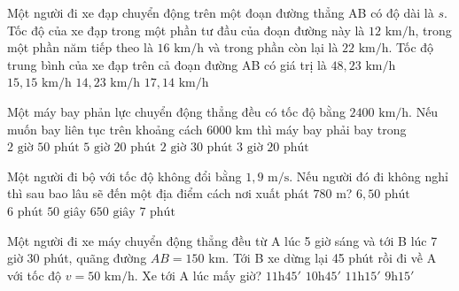 \begin{vd} Một người đi xe đạp chuyển động trên một đoạn đường thẳng AB có độ dài là $s$. Tốc độ của xe đạp trong một phần tư đầu của đoạn đường này là $12\text{ km/h}$, trong một phần năm tiếp theo là $16\text{ km/h}$ và trong phần còn lại là $22\text{ km/h}$. Tốc độ trung bình của xe đạp trên cả đoạn đường AB có giá trị là
\choice
{$48{,}23\text{ km/h}$}
{$15{,}15\text{ km/h}$}
{$14{,}23\text{ km/h}$}
{\True $17{,}14\text{ km/h}$}
\end{vd}

\begin{vd} Một máy bay phản lực chuyển động thẳng đều có tốc độ bằng $2400\text{ km/h}$. Nếu muốn bay liên tục trên khoảng cách $6000\text{ km}$ thì máy bay phải bay trong
\choice
{$2\text{ giờ } 50\text{ phút}$}
{$5\text{ giờ } 20\text{ phút}$}
{\True $2\text{ giờ } 30\text{ phút}$}
{$3\text{ giờ } 20\text{ phút}$}
\end{vd}

\begin{vd} Một người đi bộ với tốc độ không đổi bằng $1{,}9\text{ m/s}$. Nếu người đó đi không nghỉ thì sau bao lâu sẽ đến một địa điểm cách nơi xuất phát $780\text{ m}$?
\choice
{$6{,}50\text{ phút}$}
{\True $6\text{ phút } 50\text{ giây}$}
{$650\text{ giây}$}
{$7\text{ phút}$}
\end{vd}

\begin{vd} Một người đi xe máy chuyển động thẳng đều từ A lúc 5 giờ sáng và tới B lúc 7 giờ 30 phút, quãng đường $AB = 150\text{ km}$. Tới B xe dừng lại 45 phút rồi đi về A với tốc độ $v = 50\text{ km/h}$. Xe tới A lúc mấy giờ?
\choice
{$11\text{h}45'$}
{$10\text{h}45'$}
{\True $11\text{h}15'$}
{$9\text{h}15'$}
\end{vd}

